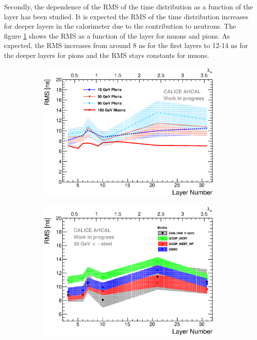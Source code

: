 Secondly, the dependence of the RMS of the time distribution as a function of the layer has been studied. It is expected the RMS of the time distribution increases for deeper layers in the calorimeter due to the contribution to neutrons. The figure \ref{fig:Depth_RMS_Comparison} shows the RMS as a function of the layer for muons and pions. As expected, the RMS increases from around 8 ns for the first layers to 12-14 ns for the deeper layers for pions and the RMS stays constants for muons.

\begin{figure}[htbp!]
	\begin{subfigure}[t]{0.49\textwidth}
		\centering
		\includegraphics[width=1\textwidth]{../Thesis_Plots/Timing/Pions/Plots/Timing_Depth_Comparison_ShortAsymRange_RMS.eps}
		\caption{} \label{fig:Depth_RMS_Comparison}
	\end{subfigure}
	\hfill
	\begin{subfigure}[t]{0.49\textwidth}
		\centering
		\includegraphics[width=1\textwidth]{../Thesis_Plots/Timing/Pions/Plots/ComparisonToSim/RMS_Depth_50GeV_Mokka.eps}

\end{subfigure}
\end{figure}
